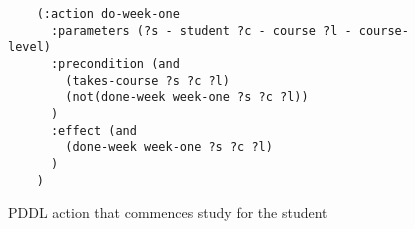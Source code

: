 \begin{figure}[t]
    \begin{lstlisting}
    (:action do-week-one
      :parameters (?s - student ?c - course ?l - course-level)
      :precondition (and 
        (takes-course ?s ?c ?l)
        (not(done-week week-one ?s ?c ?l))
      )
      :effect (and 
        (done-week week-one ?s ?c ?l)
      )
    )
    \end{lstlisting}
    \caption{PDDL action that commences study for the student}\label{fig:pddl-action-do-week-one}
\end{figure}